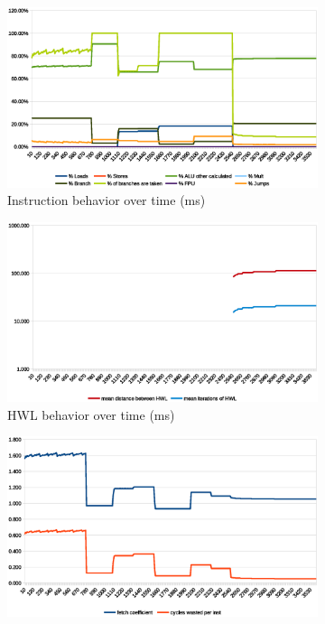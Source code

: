 \documentclass[../bachelor_paper.tex]{subfiles}
\begin{document}
\begin{figure}
    \begin{subfigure}{0.45\textwidth}
        \includegraphics[width=\textwidth]{img/graph/mibench/bitcount_inst.eps}
        \caption{Instruction behavior over time (ms)}
        \label{fig:res/bitcount/inst}
    \end{subfigure}
    \begin{subfigure}{0.45\textwidth}
        \includegraphics[width=\textwidth]{img/graph/mibench/bitcount_hwl.eps}
        \caption{\ac{HWL} behavior over time (ms)}
        \label{fig:res/bitcount/hwl}
    \end{subfigure}
    \begin{subfigure}{0.45\textwidth}
        \includegraphics[width=\textwidth]{img/graph/mibench/bitcount_fetch_waste.eps}

\end{subfigure}
\end{figure}
\end{document}
